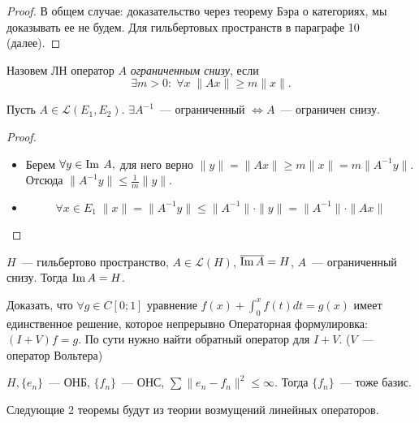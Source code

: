 \begin{proof}
    В общем случае: доказательство через теорему Бэра о категориях, мы доказывать ее не будем.
    Для гильбертовых пространств в параграфе 10 (далее).
\end{proof}

\begin{definition}[Усиление условия $\ker A = \{0\}$]
    Назовем ЛН оператор $A$ \textit{ограниченным снизу}, если
    \[\exists m > 0:\; \forall x \; \|Ax\| \geqslant m \|x\|.\]
\end{definition}

\begin{theorem}[8.1]\label{8.1}
    Пусть $A \in \mathcal{L}(E_1, E_2)$. $\exists A^{-1}$~--- ограниченный $\Leftrightarrow A$~--- ограничен снизу.
\end{theorem}
\begin{proof}
    \begin{itemize}
        \item[$\Leftarrow$]
        Берем $\forall y \in \operatorname{Im}\: A,$ для него верно \(\|y\| = \|Ax\| \geqslant m \|x\| = m \|A^{-1}y\|.\)
        Отсюда $\|A^{-1} y\| \leqslant \frac{1}{m} \|y\|$.
        \item[$\Rightarrow$]
        \[ \forall x \in E_1 \; \|x\|=\|A^{-1} y\| \leqslant \| A^{-1}\| \cdot \|y\|=\|A^{-1}\| \cdot \|Ax\| \]
    \end{itemize}
\end{proof}

\begin{exercise}
    $H$~--- гильбертово пространство, $A \in \mathcal{L}(H)$, 
    $\overline{\operatorname{Im} A} = H$, $A$~--- ограниченный снизу. Тогда $\operatorname{Im} A = H$.
\end{exercise}

\begin{example}
    Доказать, что $\forall g \in C[0;1]$ уравнение $f(x)+\int_0^x f(t)dt=g(x)$ имеет единственное решение, которое непрерывно
    Операторная формулировка: $(I + V)f = g$. По сути нужно найти обратный оператор для $I + V$. ($V$~--- оператор Вольтера)
\end{example}

\begin{example}
    $H, \{e_n\}$~--- ОНБ, $\{f_n\}$~--- ОНС, $\sum \|e_n - f_n\|^2 \le \infty.$ Тогда $\{f_n\}$~--- тоже базис.
\end{example}

Следующие 2 теоремы будут из теории возмущений линейных операторов.

